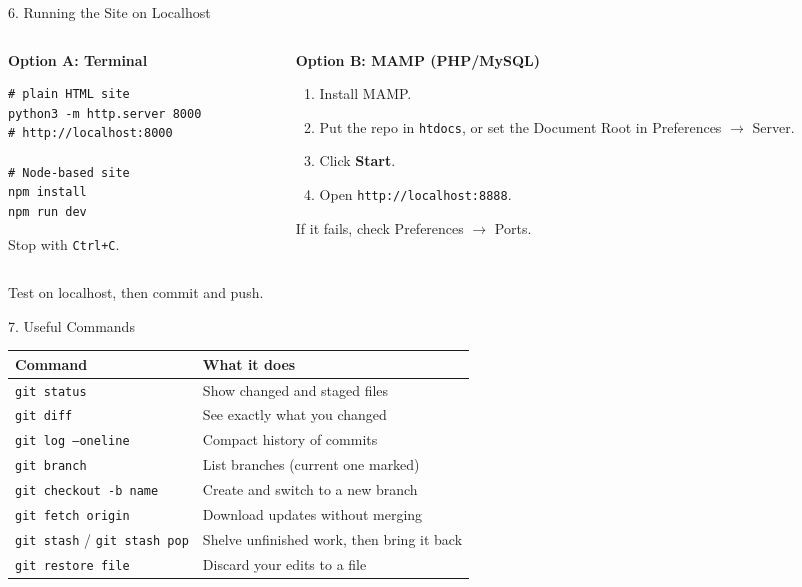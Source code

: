 \documentclass[aspectratio=169,11pt]{beamer}
\begin{document}
\begin{frame}[fragile]{6. Running the Site on Localhost}
  \begin{columns}[T]
    \begin{column}{0.48\textwidth}
      \textbf{\color{accent}Option A: Terminal}
\begin{lstlisting}
# plain HTML site
python3 -m http.server 8000
# http://localhost:8000

# Node-based site
npm install
npm run dev
\end{lstlisting}
      \vspace{0.3em}
      Stop with \texttt{Ctrl+C}.
    \end{column}
    \begin{column}{0.48\textwidth}
      \textbf{\color{accent}Option B: MAMP (PHP/MySQL)}
      \begin{enumerate}\small
        \item Install MAMP.
        \item Put the repo in \texttt{htdocs}, or set the Document Root in Preferences $\to$ Server.
        \item Click \textbf{Start}.
        \item Open \texttt{http://localhost:8888}.
      \end{enumerate}
      {\small If it fails, check Preferences $\to$ Ports.}
    \end{column}
  \end{columns}
  \vspace{0.5em}
  Test on localhost, then commit and push.
\end{frame}


\begin{frame}{7. Useful Commands}
  \small
  \renewcommand{\arraystretch}{1.35}
  \begin{tabular}{@{}p{}p{}@{}}
    \textbf{\color{accent}Command} & \textbf{\color{accent}What it does} \\
    \hline
    \texttt{git status}              & Show changed and staged files \\
    \texttt{git diff}                & See exactly what you changed \\
    \texttt{git log --oneline}       & Compact history of commits \\
    \texttt{git branch}              & List branches (current one marked) \\
    \texttt{git checkout -b name}    & Create and switch to a new branch \\
    \texttt{git fetch origin}        & Download updates without merging \\
    \texttt{git stash} / \texttt{git stash pop} & Shelve unfinished work, then bring it back \\
    \texttt{git restore file}        & Discard your edits to a file \\
  \end{tabular}
\end{frame}
\end{document}
